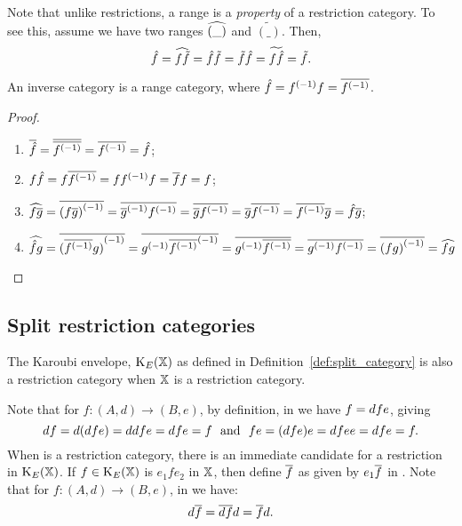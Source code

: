 \begin{remark}
  Note that unlike restrictions, a range is a \emph{property} of a restriction category. To see
  this, assume we have two ranges $\widehat{(\_)}$ and $\widetilde{(\_)}$. Then,
  \[\hat{f}=\widehat{f \tilde{f}}=\hat{f} \tilde{f}=\tilde{f} \hat{f}=\widetilde{f \hat{f}}=\tilde{f}.\]
\end{remark}
\begin{lemma}\label{lem:inverse_categories_are_range_categories}
  An inverse category \X is a range category, where $\hat{f} = {f}^{(-1)}f = \overline{{f}^{(-1)}}$.
\end{lemma}
\begin{proof}
  \prepprooflist
  \begin{enumerate}
    \item[\rrone] $\overline{\hat{f}} = \overline{\overline{{f}^{(-1)}}} = \overline{{f}^{(-1)}} = \hat{f}$;
    \item[\rrtwo] $f \hat{f} = f \overline{{f}^{(-1)}} = f {f}^{(-1)} f = \overline{f} f = f$;
    \item[\rrthree] $\widehat{f\overline{g}} = \overline{{(f\overline{g})}^{(-1)}} = \overline{{\overline{g}}^{(-1)} {f}^{(-1)}} =
      \overline{\overline{g} {f}^{(-1)}} =
      \overline{g} \overline{{f}^{(-1)}} = \overline{{f}^{(-1)}} \overline{g} =\hat{f} \overline{g}$;
    \item[\rrfour]  $\widehat{\hat{f}g} = \overline{{(\overline{{f}^{(-1)}} g)}^{(-1)}} =
      \overline{{g}^{(-1)}{\overline{{f}^{(-1)}}}^{(-1)}} = \overline{{g}^{(-1)} \overline{{f}^{(-1)}}} =
      \overline{{g}^{(-1)} {f}^{(-1)}} = \overline{{(f g)}^{(-1)}} = \widehat{f g}$
  \end{enumerate}
\end{proof}

\subsection{Split restriction categories} %
\label{sub:split_restriction_categories}

The Karoubi envelope, $\text{K}_{E}(\mathbb{X})$ as defined in Definition~\ref{def:split_category}
is also a restriction category when $\mathbb{X}$ is a restriction category.

Note that for $f:(A,d)\to(B,e)$, by definition, in \X we have $f=d\hspace{0.1pt} f e$, giving
\[
  d\hspace{0.1pt} f = d(d\hspace{0.1pt} f e) = d\hspace{0.1pt} d\hspace{0.1pt} f e = d\hspace{0.1pt} f e =f\
  \text{ and }\  f e = (d\hspace{0.1pt} f e)e = d\hspace{0.1pt} f e\hspace{0.1pt} e = d\hspace{0.1pt} f e = f.
\]
When \X is a restriction category, there is an immediate candidate for a restriction in
$\text{K}_{E}(\mathbb{X})$. If $f\in\text{K}_{E}(\mathbb{X})$ is $e_1 f e_2$ in $\mathbb{X}$, then define $\overline{f}$ as
given by $e_1 \overline{f}$ in \X. Note that for $f:(A,d)\to(B,e)$, in \X we have:
\[
  d\hspace{0.1pt}\overline{f} = \overline{d\hspace{0.1pt} f} d = \overline{f} d.
\]

